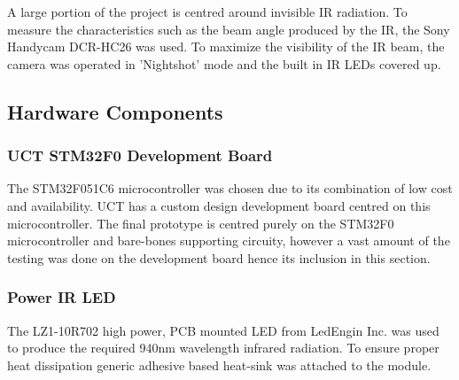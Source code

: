 A large portion of the project is centred around invisible IR radiation. To measure the characteristics such as the beam angle produced by the IR, the Sony Handycam DCR-HC26 was used. To maximize the visibility of the IR beam, the camera was operated in 'Nightshot' mode and the built in IR LEDs covered up.




\subsection{Hardware Components}

\subsubsection{UCT STM32F0 Development Board}
The STM32F051C6 microcontroller was chosen due to its combination of low cost and availability. UCT has a custom design development board centred on this microcontroller. The final prototype is centred purely on the STM32F0 microcontroller and bare-bones supporting circuity, however a vast amount of the testing was done on the development board hence its inclusion in this section.




\subsubsection{Power IR LED}

The LZ1-10R702 high power, PCB mounted LED from LedEngin Inc. was used to produce the required 940nm wavelength infrared radiation. To ensure proper heat dissipation generic adhesive based heat-sink was attached to the module.

